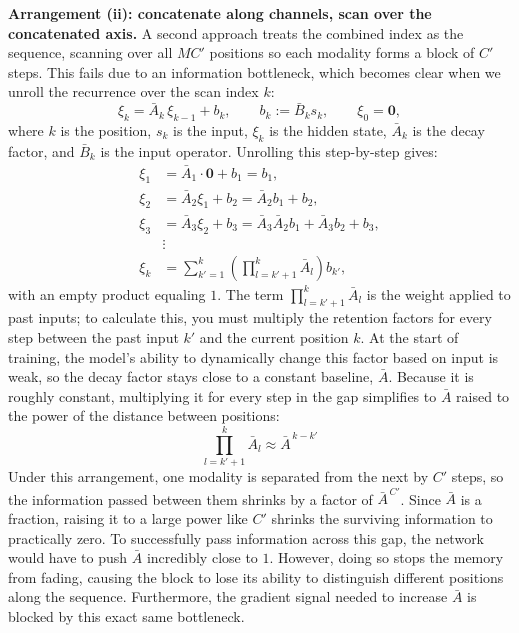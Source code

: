 \documentclass[11pt,a4paper]{article}
\begin{document}
	\textbf{Arrangement (ii): concatenate along channels, scan over the concatenated axis.} A second approach treats the combined index as the sequence, scanning over all $MC'$ positions so each modality forms a block of $C'$ steps. This fails due to an information bottleneck, which becomes clear when we unroll the recurrence over the scan index $k$: 
	$$\xi_k = \bar{A}_k\,\xi_{k-1} + b_k, \qquad b_k := \bar{B}_k s_k, \qquad \xi_0 = \mathbf{0},$$ where $k$ is the position, $s_k$ is the input, $\xi_k$ is the hidden state, $\bar{A}_k$ is the decay factor, and $\bar{B}_k$ is the input operator. Unrolling this step-by-step gives:  
	$$\begin{aligned} \xi_1 &= \bar{A}_1 \cdot \mathbf{0} + b_1 = b_1, \\ \xi_2 &= \bar{A}_2 \xi_1 + b_2 = \bar{A}_2 b_1 + b_2, \\ \xi_3 &= \bar{A}_3 \xi_2 + b_3 = \bar{A}_3\bar{A}_2 b_1 + \bar{A}_3 b_2 + b_3, \\ & \vdots \\ \xi_k &= \sum_{k'=1}^{k}\left(\prod_{l=k'+1}^{k}\bar{A}_l\right) b_{k'}, \end{aligned}$$
	with an empty product equaling $1$. The term $\prod_{l=k'+1}^{k}\bar{A}_l$ is the weight applied to past inputs; to calculate this, you must multiply the retention factors for every step between the past input $k'$ and the current position $k$. At the start of training, the model's ability to dynamically change this factor based on input is weak, so the decay factor stays close to a constant baseline, $\bar{A}$. Because it is roughly constant, multiplying it for every step in the gap simplifies to $\bar{A}$ raised to the power of the distance between positions:   
	$$\prod_{l=k'+1}^{k}\bar{A}_l \approx \bar{A}^{\,k-k'}$$ Under this arrangement, one modality is separated from the next by $C'$ steps, so the information passed between them shrinks by a factor of $\bar{A}^{\,C'}$. Since $\bar{A}$ is a fraction, raising it to a large power like $C'$ shrinks the surviving information to practically zero. To successfully pass information across this gap, the network would have to push $\bar{A}$ incredibly close to $1$. However, doing so stops the memory from fading, causing the block to lose its ability to distinguish different positions along the sequence. Furthermore, the gradient signal needed to increase $\bar{A}$ is blocked by this exact same bottleneck.  
\end{document}
